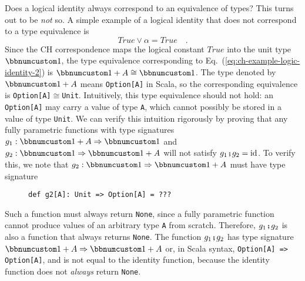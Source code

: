 Does a logical identity always correspond to an equivalence of types?
This turns out to be \emph{not} so. A simple example of a logical
identity that does not correspond to a type equivalence is
\begin{equation}
True\vee\alpha=True\quad.\label{eq:ch-example-logic-identity-2}
\end{equation}
Since the CH correspondence maps the logical constant $True$ into
the unit type $\bbnum 1$, the type equivalence corresponding to Eq.~(\ref{eq:ch-example-logic-identity-2})
is $\bbnum 1+A\cong\bbnum 1$. The type denoted by $\bbnum 1+A$ means
\lstinline!Option[A]! in Scala, so the corresponding equivalence
is \lstinline!Option[A]!$\cong$\lstinline!Unit!. Intuitively, this
type equivalence should not hold: an \lstinline!Option[A]! may carry
a value of type \lstinline!A!, which cannot possibly be stored in
a value of type \lstinline!Unit!. We can verify this intuition rigorously
by proving that any fully parametric functions with type signatures
$g_{1}:\bbnum 1+A\Rightarrow\bbnum 1$ and $g_{2}:\bbnum 1\Rightarrow\bbnum 1+A$
will not satisfy $g_{1}\bef g_{2}=\text{id}$. To verify this, we
note that $g_{2}:\bbnum 1\Rightarrow\bbnum 1+A$ must have type signature

\begin{wrapfigure}{l}{0.4\columnwidth}%
\vspace{-0.8\baselineskip}
\begin{lstlisting}
def g2[A]: Unit => Option[A] = ???
\end{lstlisting}

\vspace{-1\baselineskip}
\end{wrapfigure}%

\noindent Such a function must always return \lstinline!None!, since
a fully parametric function cannot produce values of an arbitrary
type \lstinline!A! from scratch. Therefore, $g_{1}\bef g_{2}$ is
also a function that always returns \lstinline!None!. The function
$g_{1}\bef g_{2}$ has type signature $\bbnum 1+A\Rightarrow\bbnum 1+A$
or, in Scala syntax, \lstinline!Option[A] => Option[A]!, and is not
equal to the identity function, because the identity function does
not \emph{always} return \lstinline!None!.

